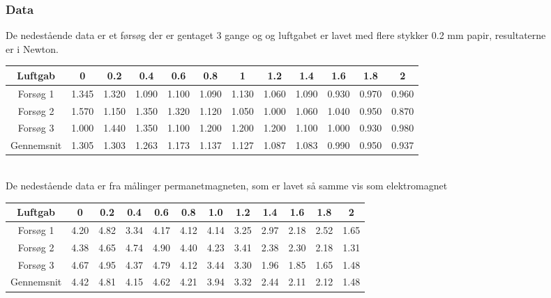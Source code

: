 \begin{figure}
\subsubsection*{Data}
De nedestående data er et førsøg der er gentaget 3 gange og og luftgabet er lavet med flere stykker 0.2 mm papir, resultaterne er i Newton. \\

\begin{tabular}{|c|c|c|c|c|c|c|c|c|c|c|c|}
\hline 
Luftgab & 0 & 0.2 & 0.4 & 0.6 & 0.8 & 1 & 1.2 & 1.4 & 1.6 & 1.8 & 2 \\ 
\hline 
Forsøg 1 & 1.345 & 1.320 & 1.090 & 1.100 & 1.090 & 1.130 & 1.060 & 1.090 & 0.930 & 0.970 & 0.960 \\ 
\hline 
Forsøg 2 & 1.570 & 1.150 & 1.350 & 1.320 & 1.120 & 1.050 & 1.000 & 1.060 & 1.040 & 0.950 & 0.870 \\ 
\hline 
Forsøg 3 & 1.000 & 1.440 & 1.350 & 1.100 & 1.200 & 1.200 & 1.200 & 1.100 & 1.000 & 0.930 & 0.980 \\ 
\hline 
Gennemsnit & 1.305 & 1.303 & 1.263 & 1.173 & 1.137 & 1.127 & 1.087 & 1.083 & 0.990 & 0.950 & 0.937 \\ 
\hline 
\end{tabular}
\\
De nedestående data er fra målinger permanetmagneten, som er lavet så samme vis som elektromagnet\\

\begin{tabular}{|c|c|c|c|c|c|c|c|c|c|c|c|}
\hline
Luftgab & 0 & 0.2 & 0.4 & 0.6 & 0.8 & 1.0 & 1.2 & 1.4 & 1.6 & 1.8 & 2 \\
\hline
Forsøg 1 & 4.20 & 4.82 & 3.34 & 4.17 & 4.12 & 4.14 & 3.25 & 2.97 & 2.18 & 2.52 & 1.65 \\
\hline
Forsøg 2 & 4.38 & 4.65 & 4.74 & 4.90 & 4.40 & 4.23 & 3.41 & 2.38 & 2.30 & 2.18 & 1.31 \\
\hline
Forsøg 3 & 4.67 & 4.95 & 4.37 & 4.79 & 4.12 & 3.44 & 3.30 & 1.96 & 1.85 & 1.65 & 1.48 \\
\hline 
Gennemsnit & 4.42 & 4.81 & 4.15 & 4.62 & 4.21 & 3.94 & 3.32 & 2.44 & 2.11 & 2.12 & 1.48 \\
\hline
\end{tabular} 


\end{figure}
